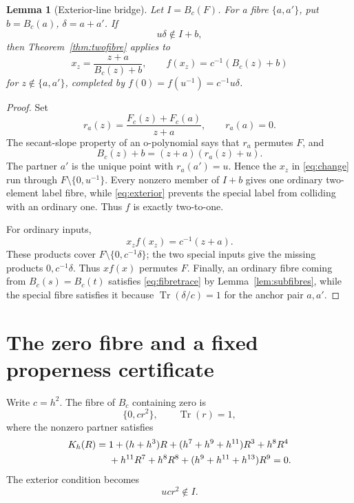 \documentclass[11pt]{article}
\newtheorem{lemma}[theorem]{Lemma}
\theoremstyle{definition}\newtheorem{definition}[theorem]{Definition}
\theoremstyle{remark}\newtheorem{remark}[theorem]{Remark}
\DeclareMathOperator{\Tr}{Tr}
\begin{document}
\begin{lemma}[Exterior-line bridge]
\label{lem:bridge}
Let \(I=B_c(F)\).  For a fibre \(\{a,a'\}\), put
\(b=B_c(a)\), \(\delta=a+a'\).  If
\begin{equation}
 u\delta\notin I+b,
 \label{eq:exterior}
\end{equation}
then Theorem~\ref{thm:twofibre} applies to
\begin{equation}
 x_z=\frac{z+a}{B_c(z)+b},\qquad
 f(x_z)=c^{-1}(B_c(z)+b)
 \label{eq:change}
\end{equation}
for \(z\notin\{a,a'\}\), completed by
\(f(0)=f(u^{-1})=c^{-1}u\delta\).
\end{lemma}
\begin{proof}
Set
\[
 r_a(z)=\frac{F_c(z)+F_c(a)}{z+a},\qquad r_a(a)=0.
\]
The secant-slope property of an o-polynomial says that \(r_a\) permutes
\(F\), and
\[
 B_c(z)+b=(z+a)(r_a(z)+u).
\]
The partner \(a'\) is the unique point with \(r_a(a')=u\).  Hence the
\(x_z\) in \eqref{eq:change} run through
\(F\setminus\{0,u^{-1}\}\).  Every nonzero member of \(I+b\) gives one
ordinary two-element label fibre, while \eqref{eq:exterior} prevents the
special label from colliding with an ordinary one.  Thus \(f\) is exactly
two-to-one.

For ordinary inputs,
\[
 x_zf(x_z)=c^{-1}(z+a).
\]
These products cover \(F\setminus\{0,c^{-1}\delta\}\); the two special
inputs give the missing products \(0,c^{-1}\delta\).  Thus \(xf(x)\)
permutes \(F\).  Finally, an ordinary fibre coming from
\(B_c(s)=B_c(t)\) satisfies \eqref{eq:fibretrace} by
Lemma~\ref{lem:subfibres}, while the special fibre satisfies it because
\(\Tr(\delta/c)=1\) for the anchor pair \(a,a'\).
\end{proof}

\section{The zero fibre and a fixed properness certificate}
Write \(c=h^2\).  The fibre of \(B_c\) containing zero is
\begin{equation}
 \{0,cr^2\},\qquad \Tr(r)=1,
 \label{eq:zerofibre}
\end{equation}
where the nonzero partner satisfies
\begin{align}
K_h(R)={}&1+(h+h^3)R+(h^7+h^9+h^{11})R^3+h^8R^4\notag\\
&+h^{11}R^7+h^8R^8+(h^9+h^{11}+h^{13})R^9=0.
\label{eq:Kh}
\end{align}
The exterior condition becomes
\begin{equation}
 ucr^2\notin I.
 \label{eq:zeroexterior}
\end{equation}
\end{document}
